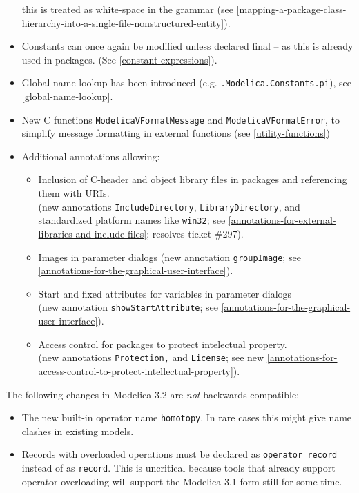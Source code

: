 \begin{itemize}
  this is treated as white-space in the grammar (see \cref{mapping-a-package-class-hierarchy-into-a-single-file-nonstructured-entity}).
\item
  Constants can once again be modified unless declared final -- as this is already used in packages.  (See \cref{constant-expressions}).
\item
  Global name lookup has been introduced (e.g.
  \lstinline!.Modelica.Constants.pi!), see \cref{global-name-lookup}.
\item
  New C functions \lstinline!ModelicaVFormatMessage! and \lstinline!ModelicaVFormatError!, to
  simplify message formatting in external functions (see \cref{utility-functions})
\item
  Additional annotations allowing:
  \begin{itemize}
  \item
    Inclusion of C-header and object library files in packages and
    referencing them with URIs.\\
    (new annotations \lstinline!IncludeDirectory!, \lstinline!LibraryDirectory!, and
    standardized platform names like \lstinline!win32!; see \cref{annotations-for-external-libraries-and-include-files}; resolves
    ticket \#297).
  \item
    Images in parameter dialogs (new annotation \lstinline!groupImage!; see
    \cref{annotations-for-the-graphical-user-interface}).
  \item
    Start and fixed attributes for variables in parameter dialogs\\
    (new annotation \lstinline!showStartAttribute!; see \cref{annotations-for-the-graphical-user-interface}).
  \item
    Access control for packages to protect intelectual property.\\
    (new annotations \lstinline!Protection,! and \lstinline!License!; see new \cref{annotations-for-access-control-to-protect-intellectual-property}).
  \end{itemize}
\end{itemize}

The following changes in Modelica 3.2 are \emph{not} backwards compatible:
\begin{itemize}
\item
  The new built-in operator name \lstinline!homotopy!. In rare cases this might
  give name clashes in existing models.
\item
  Records with overloaded operations must be declared as \lstinline!operator record! instead of as \lstinline!record!. This is uncritical because tools
  that already support operator overloading will support the Modelica
  3.1 form still for some time.
\end{itemize}

